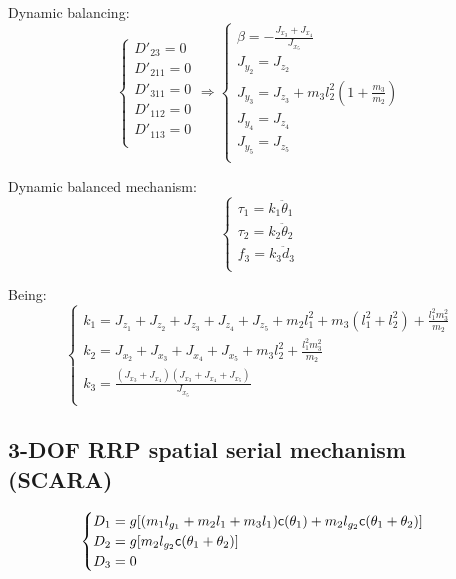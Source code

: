 \documentclass[a4paper,11pt,brazil,fleqn]{article}
\begin{document}
Dynamic balancing:
\begin{equation}
\begin{cases}
D'_{23} = 0 \\
D'_{211} = 0 \\
D'_{311} = 0 \\
D'_{112} = 0 \\
D'_{113} = 0 \\
\end{cases}
\Rightarrow
\begin{cases}
\beta = -\frac{J_{x_3}+J_{x_4}}{J_{x_5}} \\
J_{y_2} = J_{z_2} \\
J_{y_3} = J_{z_3} + m_3 l_2^2 ( 1 + \frac{m_3}{m_2} )\\
J_{y_4} = J_{z_4} \\
J_{y_5} = J_{z_5} \\
\end{cases}
\end{equation}

Dynamic balanced mechanism:
\begin{equation}
\begin{cases}
\tau_1 = k_1 \ddot{\theta}_1 \\
\tau_2 = k_2 \ddot{\theta}_2 \\
f_3 = k_3 \ddot{d}_3 \\
\end{cases}
\end{equation}

Being:
\begin{equation}
\begin{cases}
k_1 = J_{z_1} + J_{z_2} + J_{z_3} + J_{z_4} + J_{z_5} + m_2 l_1^2 + m_3 (l_1^2 + l_2^2) + \frac{l_1^2 m_3^2}{m_2} \\
k_2 =  J_{x_2} + J_{x_3} + J_{x_4} + J_{x_5} + m_3 l_2^2 + \frac{l_1^2 m_3^2}{m_2}\\
k_3 = \frac{(J_{x_3}+J_{x_4})(J_{x_3}+J_{x_4}+J_{x_5})}{J_{x_5}} \\
\end{cases}
\end{equation}

\subsection{3-DOF RRP spatial serial mechanism (SCARA)} \label{S03-2}

\begin{equation}
\begin{cases}
D_1 = g[ (m_1 l_{g_1} + m_2 l_1 + m_3 l_1 ) \mathsf{c}(\theta_1) + m_2 l_{g_2} \mathsf{c}(\theta_1+\theta_2) ] \\
D_2 = g[ m_2 l_{g_2} \mathsf{c}(\theta_1+\theta_2)  ] \\
D_3 = 0 \\
\end{cases}
\end{equation} 
\end{document}

